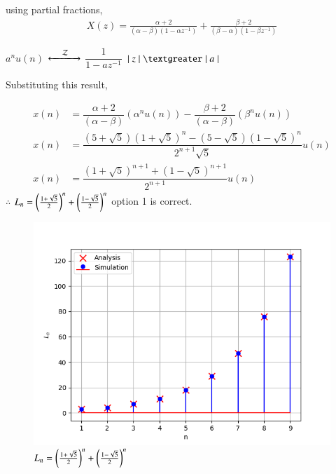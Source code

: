 \documentclass[journal,12pt,twocolumn]{IEEEtran}
\theoremstyle{remark}
\begin{document}
	\vspace{0.4cm}
 using partial fractions,
 \begin{align}
     X(z)=\frac{\alpha+2}{(\alpha-\beta)(1-\alpha z^{-1})}+\frac{\beta+2}{(\beta-\alpha)(1-\beta z^{-1})}
 \end{align}
 
	$a^n u(n)$
	$\xleftarrow[]{\hspace{0.4cm}{\mathcal{Z}}\hspace{0.1cm}}\xrightarrow[]{}$
	$\dfrac{1}{1 - a z^{-1}}$ \hspace{0.2cm} $\lvert \hspace{0.1cm} z \hspace{0.1cm}\rvert \hspace{0.1cm} \textgreater \hspace{0.1cm} \lvert \hspace{0.1cm} a \hspace{0.1cm} \rvert$
	
	\vspace{0.4cm}
	
	Substituting this result,
	
	\vspace{-0.5cm}
	
	\begin{align}
		x(n) &= \dfrac{\alpha+2}{(\alpha - \beta)} (\alpha^n u(n)) - \dfrac{\beta+2}{(\alpha - \beta)} (\beta^n u(n))\\
	    x(n) &= \dfrac{(5+\sqrt{5})(1 + \sqrt{5})^{n} - (5-\sqrt{5})(1 - \sqrt{5})^{n} }{2^{n+1} \sqrt{5}} u(n)\\
    	x(n) &= \dfrac{(1 + \sqrt{5})^{n+1} +(1 - \sqrt{5})^{n+1} }{2^{n+1}} u(n)
    \end{align}
$\therefore$ $L_{n} =\left(\frac{1+\sqrt{5}}{2}\right)^n+\left(\frac{1-\sqrt{5}}{2}\right)^n$
option 1 is correct.
\newpage
\begin{figure}[h]
  \centering
  \includegraphics[width=\columnwidth]{2023/CS/15/figs/fig1.png}
  \caption{$L_{n}=\left(\frac{1+\sqrt{5}}{2}\right)^n+\left(\frac{1-\sqrt{5}}{2}\right)^n$}
  \label{fig:graph}
\end{figure}
\end{document}
